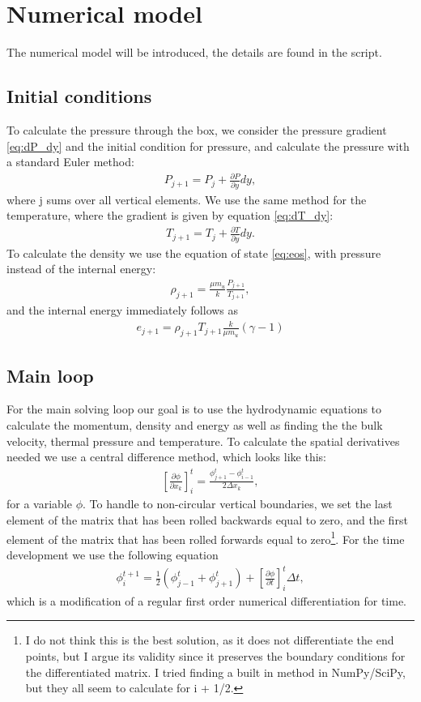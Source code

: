 \documentclass[a4paper,10pt]{article}
\begin{document}
\section{Numerical model}
The numerical model will be introduced, the details are found in the script.
\subsection{Initial conditions}
To calculate the pressure through the box, we consider the pressure gradient \eqref{eq:dP_dy} and the initial condition for pressure, and calculate the pressure with a standard Euler method:
%
\begin{align*}
P_{j+1} = P_j + \frac{\partial P}{\partial y} dy,
\end{align*}
%
where j sums over all vertical elements. We use the same method for the temperature, where the gradient is given by equation \eqref{eq:dT_dy}:
%
\begin{align*}
T_{j+1} = T_j + \frac{\partial T}{\partial y}dy.
\end{align*}
%
To calculate the density we use the equation of state \eqref{eq:eos}, with pressure instead of the internal energy:
%
\begin{align*}
\rho_{j+1} = \frac{\mu m_u}{k}\frac{P_{j+1}}{T_{j+1}},
\end{align*}
%
and the internal energy immediately follows as
%
\begin{align*}
e_{j+1} = \rho_{j+1}T_{j+1}\frac{k}{\mu m_u}\left(\gamma -1\right)
\end{align*}

\subsection{Main loop}
For the main solving loop our goal is to use the hydrodynamic equations to calculate the momentum, density and energy as well as finding the the bulk velocity, thermal pressure and  temperature. To calculate the spatial derivatives needed we use a central difference method, which looks like this:
%
\begin{align}\label{eq:centr_diff}
\left[\frac{\partial \phi}{\partial x_k}\right]_i^t = \frac{\phi_{j+1}^t - \phi_{i-1}^t}{2\Delta x_k},
\end{align}
%
for a variable $\phi$. To handle to non-circular vertical boundaries, we set the last element of the matrix that has been rolled backwards equal to zero, and the first element of the matrix that has been rolled forwards equal to zero\footnote{I do not think this is the best solution, as it does not differentiate the end points, but I argue its validity since it preserves the boundary conditions for the differentiated matrix. I tried finding a built in method in NumPy/SciPy, but they all seem to calculate for i + 1/2.}. For the time development we use the following equation
%
\begin{align}
\phi_i^{t+1} = \frac{1}{2}\left(\phi_{j-1}^t + \phi_{j+1}^t\right) + \left[\frac{\partial \phi}{\partial t}\right]_i^t\Delta t,
\end{align}
%
which is a modification of a regular first order numerical differentiation for time.
\end{document}
